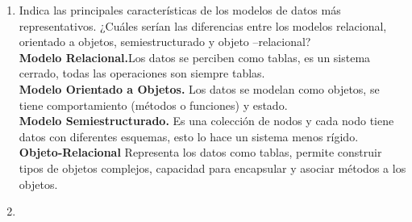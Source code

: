 \documentclass[12pt]{article}
\begin{document}
\begin{enumerate}
\begin{itemize}
	  \end{itemize}
      \item Indica las principales características de los modelos de
      datos más representativos. ¿Cuáles serían las diferencias
      entre los  modelos relacional, orientado a objetos,
      semiestructurado y objeto –relacional?\\
      \textbf{Modelo Relacional.}Los datos se perciben como tablas,
      es un sistema cerrado, todas las operaciones son siempre tablas.\\
      \textbf{Modelo Orientado a Objetos.} Los datos se modelan como
      objetos, se tiene comportamiento (métodos o funciones) y estado.\\
      \textbf{Modelo Semiestructurado.} Es una colección de nodos y
      cada nodo tiene datos con diferentes esquemas, esto lo hace un 
      sistema menos rígido.\\
      \textbf{Objeto-Relacional} Representa los datos como tablas,
      permite construir tipos de objetos complejos, capacidad para
      encapsular y asociar métodos a los objetos.
      \item 
	   	
 \end{enumerate}
\end{document}
